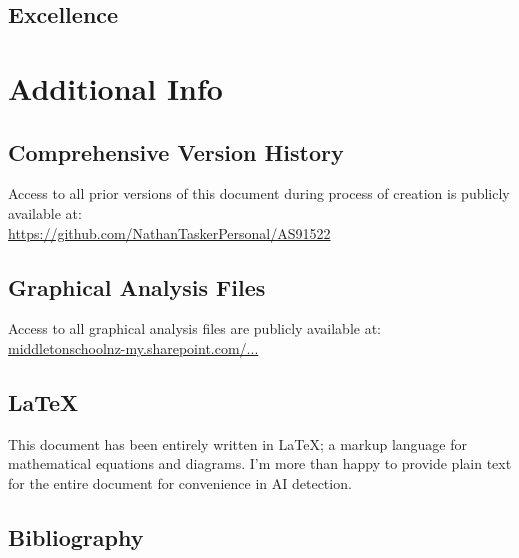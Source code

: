 \documentclass[11pt, a4paper]{article}
\begin{document}
	\subsection{Excellence}
	\section{Additional Info}
	\subsection{Comprehensive Version History}
	Access to all prior versions of this document during process of creation is publicly available at:\\
	\url{https://github.com/NathanTaskerPersonal/AS91522}
	\subsection{Graphical Analysis Files}
	Access to all graphical analysis files are publicly available at:\\
	\href{https://middletonschoolnz-my.sharepoint.com/:f:/g/personal/taskern_middleton_school_nz/EhEmw21C2L9Fn9BYUy2ccwMBn6xCUF93vtfvtT_5_rkxbA?e=Tp02lP}{middletonschoolnz-my.sharepoint.com/...}
	\subsection{\LaTeX}
	This document has been entirely written in \LaTeX; a markup language for mathematical equations and diagrams. I'm more than happy to provide plain text for the entire document for convenience in AI detection.
	\subsection{Bibliography}
\end{document}
